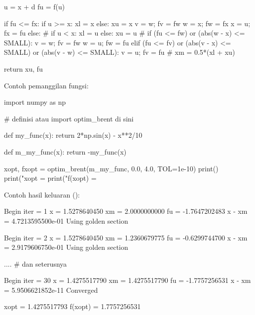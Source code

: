 \begin{pythoncode}
        u = x + d
        fu = f(u)

        if fu <= fx:
            if u >= x:
                xl = x
            else:
                xu = x
            v = w; fv = fw
            w = x; fw = fx
            x = u; fx = fu
        else:
            #
            if u < x:
                xl = u
            else:
                xu = u
            #
            if (fu <= fw) or (abs(w - x) <= SMALL):
                v = w; fv = fw
                w = u; fw = fu
            elif (fu <= fv) or (abs(v - x) <= SMALL) or (abs(v - w) <= SMALL):
                v = u; fv = fu
        #
        xm = 0.5*(xl + xu)

    return xu, fu
\end{pythoncode}

Contoh pemanggilan fungsi:
\begin{pythoncode}
import numpy as np

# definisi atau import optim_brent di sini

def my_func(x):
    return 2*np.sin(x) - x**2/10

def m_my_func(x):
    return -my_func(x)

xopt, fxopt = optim_brent(m_my_func, 0.0, 4.0, TOL=1e-10)
print()
print("xopt    = %
print("f(xopt) = %
\end{pythoncode}

Contoh hasil keluaran ():
\begin{textcode}
Begin iter =  1
x      =       1.5278640450
xm     =       2.0000000000
fu     =      -1.7647202483
x - xm =   4.7213595500e-01
Using golden section

Begin iter =  2
x      =       1.5278640450
xm     =       1.2360679775
fu     =      -0.6299744700
x - xm =   2.9179606750e-01
Using golden section

.... # dan seterusnya

Begin iter =  30
x      =       1.4275517790
xm     =       1.4275517790
fu     =      -1.7757256531
x - xm =   5.9506621852e-11
Converged

xopt    =       1.4275517793
f(xopt) =       1.7757256531
\end{textcode}
